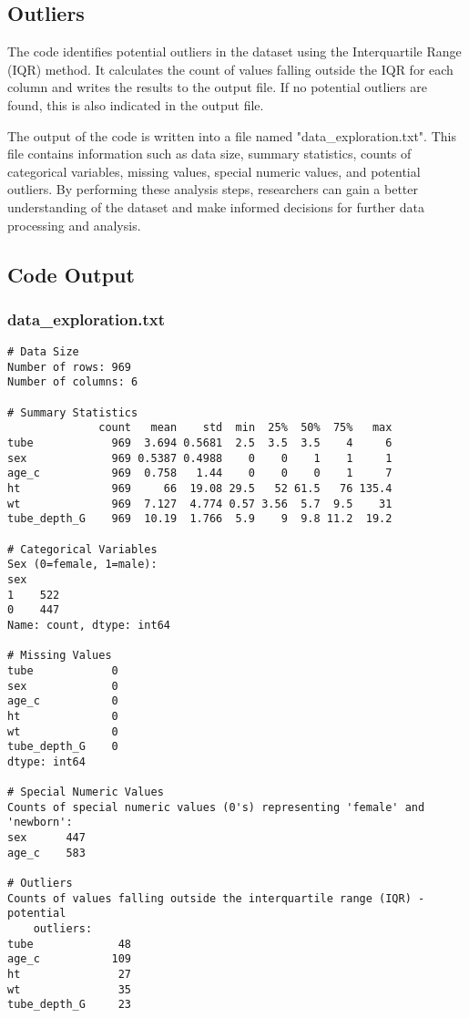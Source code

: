 \documentclass[11pt]{article}
\begin{document}
\subsection{Outliers}
The code identifies potential outliers in the dataset using the Interquartile Range (IQR) method. It calculates the count of values falling outside the IQR for each column and writes the results to the output file. If no potential outliers are found, this is also indicated in the output file.

The output of the code is written into a file named "data\_exploration.txt". This file contains information such as data size, summary statistics, counts of categorical variables, missing values, special numeric values, and potential outliers. By performing these analysis steps, researchers can gain a better understanding of the dataset and make informed decisions for further data processing and analysis.

\subsection{Code Output}

\subsubsection*{data\_exploration.txt}

\begin{Verbatim}[tabsize=4]
# Data Size
Number of rows: 969
Number of columns: 6

# Summary Statistics
              count   mean    std  min  25%  50%  75%   max
tube            969  3.694 0.5681  2.5  3.5  3.5    4     6
sex             969 0.5387 0.4988    0    0    1    1     1
age_c           969  0.758   1.44    0    0    0    1     7
ht              969     66  19.08 29.5   52 61.5   76 135.4
wt              969  7.127  4.774 0.57 3.56  5.7  9.5    31
tube_depth_G    969  10.19  1.766  5.9    9  9.8 11.2  19.2

# Categorical Variables
Sex (0=female, 1=male):
sex
1    522
0    447
Name: count, dtype: int64

# Missing Values
tube            0
sex             0
age_c           0
ht              0
wt              0
tube_depth_G    0
dtype: int64

# Special Numeric Values
Counts of special numeric values (0's) representing 'female' and 'newborn':
sex      447
age_c    583

# Outliers
Counts of values falling outside the interquartile range (IQR) - potential
	outliers:
tube             48
age_c           109
ht               27
wt               35
tube_depth_G     23

\end{Verbatim}
\end{document}
